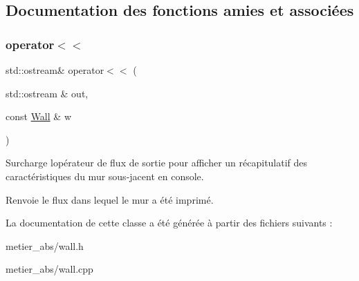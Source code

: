 \subsection{Documentation des fonctions amies et associées}
\mbox{\label{class_wall_a762127d24b7c3e98f9da57702f628a78}} 
\subsubsection{\texorpdfstring{operator$<$$<$}{operator<<}}
{\footnotesize\ttfamily std\+::ostream\& operator$<$$<$ (\begin{DoxyParamCaption}\item[{std\+::ostream \&}]{out,  }\item[{const \mbox{\hyperlink{class_wall}{Wall}} \&}]{w }\end{DoxyParamCaption})\hspace{0.3cm}{\ttfamily [friend]}}

Surcharge l\textquotesingle{}opérateur de flux de sortie pour afficher un récapitulatif des caractéristiques du mur sous-\/jacent en console. \begin{DoxyReturn}{Renvoie}
le flux dans lequel le mur a été imprimé. 
\end{DoxyReturn}


La documentation de cette classe a été générée à partir des fichiers suivants \+:\begin{DoxyCompactItemize}
\item 
metier\+\_\+abs/wall.\+h\item 
metier\+\_\+abs/wall.\+cpp\end{DoxyCompactItemize}
